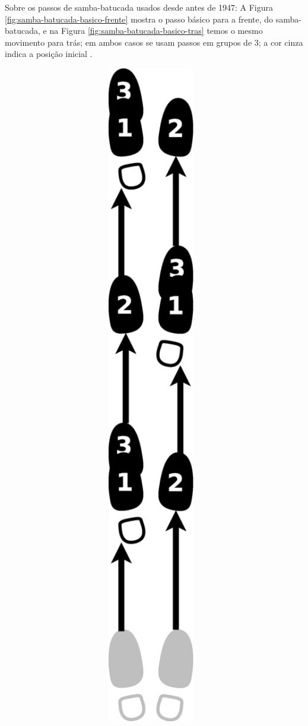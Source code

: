 \begin{itemize}
Sobre os passos de samba-batucada usados desde antes de 1947: 
A Figura \ref{fig:samba-batucada-basico-frente}  mostra o passo básico para a 
frente, do samba-batucada, 
e na  Figura \ref{fig:samba-batucada-basico-tras} temos o mesmo movimento para trás;
em ambos casos se usam passos em grupos de 3; a cor cinza indica a posição inicial \cite[pp. 61-62]{fornaciari1947aprender} \cite[pp. 63]{freitas1959danca}. 
\begin{figure}[h]
    \centering
    \begin{subfigure}[b]{0.7\textwidth}
        \centering
        \includegraphics[angle=270,width=0.97\textwidth]{chapters/cap-historia-sambagafieira/samba-batucada-basico-frente.eps}

\end{subfigure}
\end{figure}
\end{itemize}
